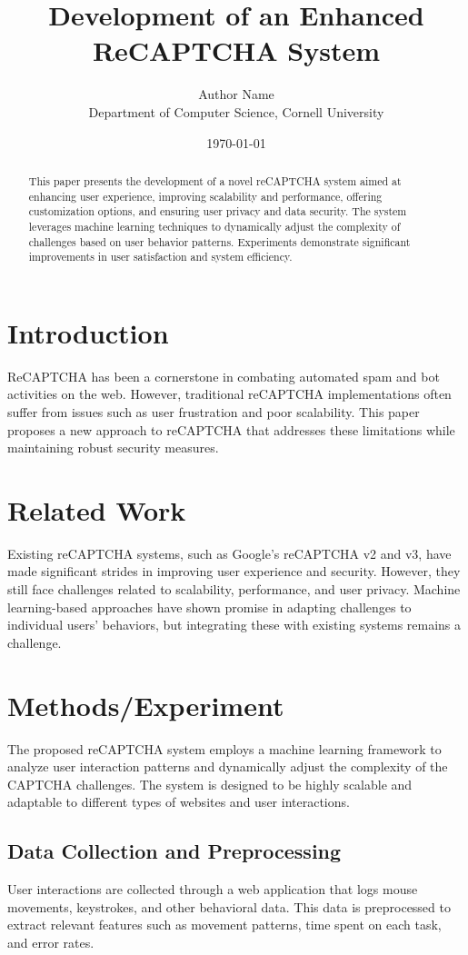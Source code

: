 \documentclass{article}
\title{Development of an Enhanced ReCAPTCHA System}
\author{Author Name\\Department of Computer Science, Cornell University}
\date{\today}
\begin{document}
\maketitle

\begin{abstract}
This paper presents the development of a novel reCAPTCHA system aimed at enhancing user experience, improving scalability and performance, offering customization options, and ensuring user privacy and data security. The system leverages machine learning techniques to dynamically adjust the complexity of challenges based on user behavior patterns. Experiments demonstrate significant improvements in user satisfaction and system efficiency.
\end{abstract}

\section{Introduction}
ReCAPTCHA has been a cornerstone in combating automated spam and bot activities on the web. However, traditional reCAPTCHA implementations often suffer from issues such as user frustration and poor scalability. This paper proposes a new approach to reCAPTCHA that addresses these limitations while maintaining robust security measures.

\section{Related Work}
Existing reCAPTCHA systems, such as Google's reCAPTCHA v2 and v3, have made significant strides in improving user experience and security. However, they still face challenges related to scalability, performance, and user privacy. Machine learning-based approaches have shown promise in adapting challenges to individual users' behaviors, but integrating these with existing systems remains a challenge.

\section{Methods/Experiment}
The proposed reCAPTCHA system employs a machine learning framework to analyze user interaction patterns and dynamically adjust the complexity of the CAPTCHA challenges. The system is designed to be highly scalable and adaptable to different types of websites and user interactions. 

\subsection{Data Collection and Preprocessing}
User interactions are collected through a web application that logs mouse movements, keystrokes, and other behavioral data. This data is preprocessed to extract relevant features such as movement patterns, time spent on each task, and error rates.
\end{document}
